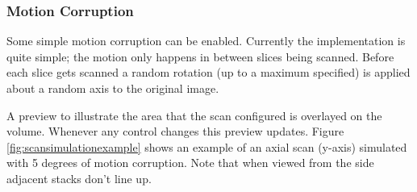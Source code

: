 \subsubsection*{Motion Corruption}
Some simple motion corruption can be enabled. Currently the implementation is quite simple; the motion only happens in between slices being scanned. Before each slice gets scanned a random rotation (up to a maximum specified) is applied about a random axis to the original image.

A preview to illustrate the area that the scan configured is overlayed on the volume. Whenever any control changes this preview updates. Figure \ref{fig:scansimulationexample} shows an example of an axial scan (y-axis) simulated with 5 degrees of motion corruption. Note that when viewed from the side adjacent stacks don't line up.

